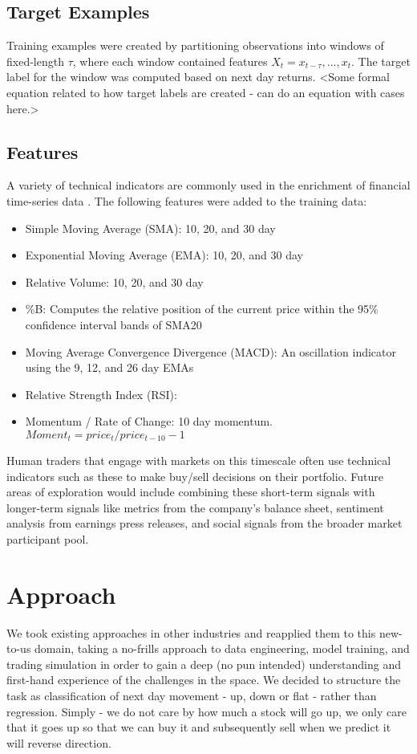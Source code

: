 \documentclass[10pt,twocolumn,letterpaper]{article}
\begin{document}
    \subsection{Target Examples}
    Training examples were created by partitioning observations into windows of fixed-length $\tau$, where each window contained features $X_t = x_{t - \tau},..., x_t$. The target label for the window was computed based on next day returns.
<Some formal equation related to how target labels are created - can do an equation with cases here.> %

    \subsection{Features}
A variety of technical indicators are commonly used in the enrichment of financial time-series data \cite{insert some refs here}. The following features were added to the training data:

    \begin{itemize}
        \item{Simple Moving Average (SMA): 10, 20, and 30 day}
        \item{Exponential Moving Average (EMA): 10, 20, and 30 day}
        \item{Relative Volume: 10, 20, and 30 day}
        \item{\%B: Computes the relative position of the current price within the 95\% confidence interval bands of SMA20}
        \item{Moving Average Convergence Divergence (MACD): An oscillation indicator using the 9, 12, and 26 day EMAs}
        \item{Relative Strength Index (RSI):}
        \item{Momentum / Rate of Change: 10 day momentum. $Moment_t = price_t / price_{t-10} - 1$}
    \end{itemize}

Human traders that engage with markets on this timescale often use technical indicators such as these to make buy/sell decisions on their portfolio. Future areas of exploration would include combining these short-term signals with longer-term signals like metrics from the company’s balance sheet, sentiment analysis from earnings press releases, and social signals from the broader market participant pool.

    \section{Approach}
We took existing approaches in other industries and reapplied them to this new-to-us domain, taking a no-frills approach to data engineering, model training, and trading simulation in order to gain a deep (no pun intended) understanding and first-hand experience of the challenges in the space. We decided to structure the task as classification of next day movement - up, down or flat - rather than regression. Simply - we do not care by how much a stock will go up, we only care that it goes up so that we can buy it and subsequently sell when we predict it will reverse direction.
\end{document}
